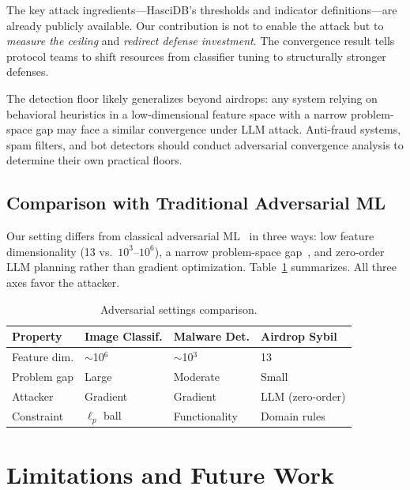 \documentclass[sigconf,nonacm=false]{acmart}
\begin{document}
The key attack ingredients---HasciDB's thresholds and indicator definitions---are already publicly available. Our contribution is not to enable the attack but to \textit{measure the ceiling} and \textit{redirect defense investment}. The convergence result tells protocol teams to shift resources from classifier tuning to structurally stronger defenses.

The detection floor likely generalizes beyond airdrops: any system relying on behavioral heuristics in a low-dimensional feature space with a narrow problem-space gap may face a similar convergence under LLM attack. Anti-fraud systems, spam filters, and bot detectors should conduct adversarial convergence analysis to determine their own practical floors.

\subsection{Comparison with Traditional Adversarial ML}

Our setting differs from classical adversarial ML~\cite{goodfellow2014,madry2018} in three ways: low feature dimensionality (13 vs.\ $10^3$--$10^6$), a narrow problem-space gap~\cite{pierazzi2020}, and zero-order LLM planning rather than gradient optimization. Table~\ref{tab:comparison_adv} summarizes. All three axes favor the attacker.

\begin{table}[t]
\caption{Adversarial settings comparison.}
\label{tab:comparison_adv}
\small
\begin{tabular}{p{1.6cm}p{1.8cm}p{1.8cm}p{1.6cm}}
\toprule
Property & Image Classif. & Malware Det. & Airdrop Sybil \\
\midrule
Feature dim. & $\sim$10$^6$ & $\sim$10$^3$ & 13 \\
Problem gap & Large & Moderate & Small \\
Attacker & Gradient & Gradient & LLM (zero-order) \\
Constraint & $\ell_p$ ball & Functionality & Domain rules \\
\bottomrule
\end{tabular}
\end{table}


\section{Limitations and Future Work}
\label{sec:limitations}
\end{document}
